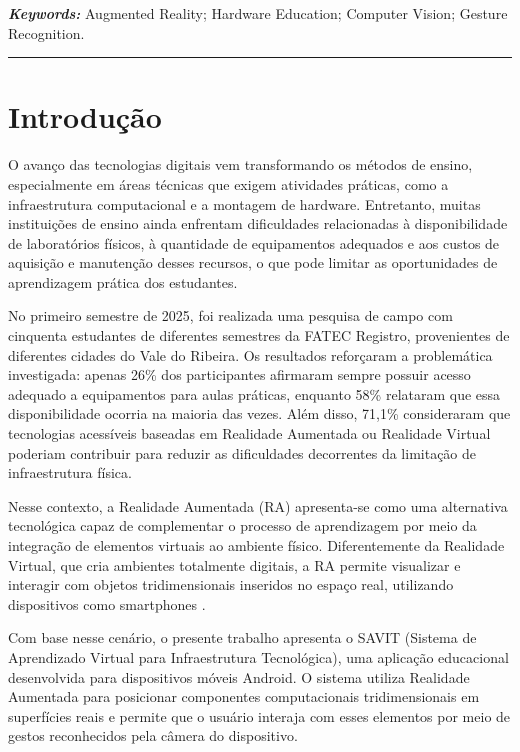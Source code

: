 \documentclass[11pt,a4paper]{article}
\begin{document}
\vspace{0.3cm}
\noindent\textit{\textbf{Keywords:}} Augmented Reality; Hardware Education; Computer Vision; Gesture Recognition.

\vspace{0.5cm}
\noindent\rule{\textwidth}{0.5pt}
\vspace{0.5cm}


\section{Introdução}

O avanço das tecnologias digitais vem transformando os métodos de ensino, especialmente em áreas técnicas que exigem atividades práticas, como a infraestrutura computacional e a montagem de hardware. Entretanto, muitas instituições de ensino ainda enfrentam dificuldades relacionadas à disponibilidade de laboratórios físicos, à quantidade de equipamentos adequados e aos custos de aquisição e manutenção desses recursos, o que pode limitar as oportunidades de aprendizagem prática dos estudantes.

No primeiro semestre de 2025, foi realizada uma pesquisa de campo com cinquenta estudantes de diferentes semestres da FATEC Registro, provenientes de diferentes cidades do Vale do Ribeira. Os resultados reforçaram a problemática investigada: apenas 26\% dos participantes afirmaram sempre possuir acesso adequado a equipamentos para aulas práticas, enquanto 58\% relataram que essa disponibilidade ocorria na maioria das vezes. Além disso, 71,1\% consideraram que tecnologias acessíveis baseadas em Realidade Aumentada ou Realidade Virtual poderiam contribuir para reduzir as dificuldades decorrentes da limitação de infraestrutura física.

Nesse contexto, a Realidade Aumentada (RA) apresenta-se como uma alternativa tecnológica capaz de complementar o processo de aprendizagem por meio da integração de elementos virtuais ao ambiente físico. Diferentemente da Realidade Virtual, que cria ambientes totalmente digitais, a RA permite visualizar e interagir com objetos tridimensionais inseridos no espaço real, utilizando dispositivos como smartphones \cite{tori2006}.

Com base nesse cenário, o presente trabalho apresenta o SAVIT (Sistema de Aprendizado Virtual para Infraestrutura Tecnológica), uma aplicação educacional desenvolvida para dispositivos móveis Android. O sistema utiliza Realidade Aumentada para posicionar componentes computacionais tridimensionais em superfícies reais e permite que o usuário interaja com esses elementos por meio de gestos reconhecidos pela câmera do dispositivo.
\end{document}
